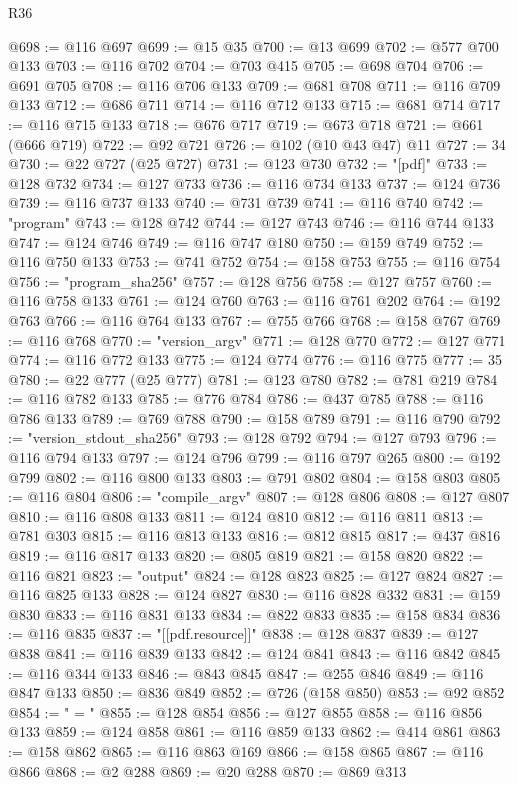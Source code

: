 \begin{lexlean}{R36}
\begin{coremodule}
@698 := @116 @697
@699 := @15 @35
@700 := @13 @699
@702 := @577 @700 @133
@703 := @116 @702
@704 := @703 @415
@705 := @698 @704
@706 := @691 @705
@708 := @116 @706 @133
@709 := @681 @708
@711 := @116 @709 @133
@712 := @686 @711
@714 := @116 @712 @133
@715 := @681 @714
@717 := @116 @715 @133
@718 := @676 @717
@719 := @673 @718
@721 := @661 (@666 @719)
@722 := @92 @721
@726 := @102 (@10 @43 @47) @11
@727 := 34
@730 := @22 @727 (@25 @727)
@731 := @123 @730
@732 := "[pdf]"
@733 := @128 @732
@734 := @127 @733
@736 := @116 @734 @133
@737 := @124 @736
@739 := @116 @737 @133
@740 := @731 @739
@741 := @116 @740
@742 := "program"
@743 := @128 @742
@744 := @127 @743
@746 := @116 @744 @133
@747 := @124 @746
@749 := @116 @747 @180
@750 := @159 @749
@752 := @116 @750 @133
@753 := @741 @752
@754 := @158 @753
@755 := @116 @754
@756 := "program_sha256"
@757 := @128 @756
@758 := @127 @757
@760 := @116 @758 @133
@761 := @124 @760
@763 := @116 @761 @202
@764 := @192 @763
@766 := @116 @764 @133
@767 := @755 @766
@768 := @158 @767
@769 := @116 @768
@770 := "version_argv"
@771 := @128 @770
@772 := @127 @771
@774 := @116 @772 @133
@775 := @124 @774
@776 := @116 @775
@777 := 35
@780 := @22 @777 (@25 @777)
@781 := @123 @780
@782 := @781 @219
@784 := @116 @782 @133
@785 := @776 @784
@786 := @437 @785
@788 := @116 @786 @133
@789 := @769 @788
@790 := @158 @789
@791 := @116 @790
@792 := "version_stdout_sha256"
@793 := @128 @792
@794 := @127 @793
@796 := @116 @794 @133
@797 := @124 @796
@799 := @116 @797 @265
@800 := @192 @799
@802 := @116 @800 @133
@803 := @791 @802
@804 := @158 @803
@805 := @116 @804
@806 := "compile_argv"
@807 := @128 @806
@808 := @127 @807
@810 := @116 @808 @133
@811 := @124 @810
@812 := @116 @811
@813 := @781 @303
@815 := @116 @813 @133
@816 := @812 @815
@817 := @437 @816
@819 := @116 @817 @133
@820 := @805 @819
@821 := @158 @820
@822 := @116 @821
@823 := "output"
@824 := @128 @823
@825 := @127 @824
@827 := @116 @825 @133
@828 := @124 @827
@830 := @116 @828 @332
@831 := @159 @830
@833 := @116 @831 @133
@834 := @822 @833
@835 := @158 @834
@836 := @116 @835
@837 := "[[pdf.resource]]"
@838 := @128 @837
@839 := @127 @838
@841 := @116 @839 @133
@842 := @124 @841
@843 := @116 @842
@845 := @116 @344 @133
@846 := @843 @845
@847 := @255 @846
@849 := @116 @847 @133
@850 := @836 @849
@852 := @726 (@158 @850)
@853 := @92 @852
@854 := " = "
@855 := @128 @854
@856 := @127 @855
@858 := @116 @856 @133
@859 := @124 @858
@861 := @116 @859 @133
@862 := @414 @861
@863 := @158 @862
@865 := @116 @863 @169
@866 := @158 @865
@867 := @116 @866
@868 := @2 @288
@869 := @20 @288
@870 := @869 @313

\end{coremodule}
\end{lexlean}
